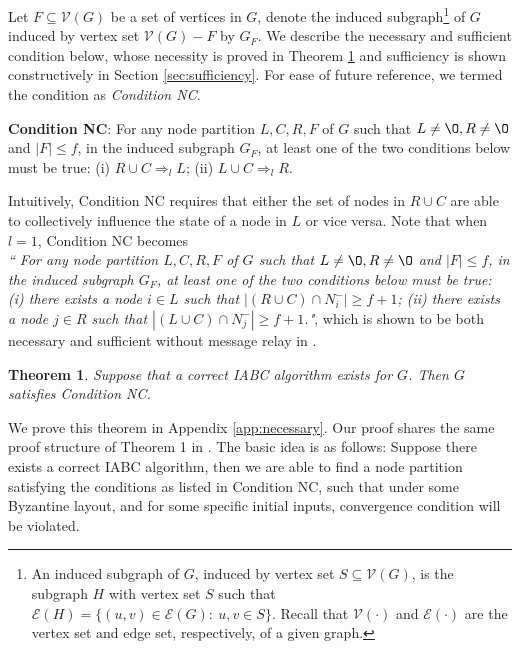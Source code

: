 \documentclass[letterpaper, 11pt]{article}
\newtheorem{theorem}{Theorem}[section]
\newcommand{\pth}[1]{\left( #1 \right)}
\newcommand{\calE}{{\mathcal{E}}}
\newcommand{\calV}{{\mathcal{V}}}
\begin{document}
Let $F\subseteq \calV(G)$ be a set of vertices in $G$, denote the induced subgraph\footnote{An induced subgraph of $G$, induced by vertex set $S\subseteq \calV(G)$, is the subgraph $H$ with vertex set $S$ such that $\calE(H)=\{(u,v)\in \calE(G): ~ u, v\in S\}$. Recall that $\calV(\cdot)$ and $\calE(\cdot)$ are the vertex set and edge set, respectively, of a given graph.} of $G$ induced by vertex set $\calV(G)-F$ by $G_F$. We describe the necessary and sufficient condition below, whose necessity is proved in Theorem \ref{thm:nc} and sufficiency is shown constructively in Section \ref{sec:sufficiency}. For ease of future reference, we termed the condition as \emph{Condition NC}.

\noindent\textbf{Condition NC}:
For any node partition $L, C, R, F$ of $G$ such that $L\not=\O, R\not=\O$ and $|F|\le f$, in the induced subgraph $G_F$,
at least one of the two conditions below must be true: (i) $R\cup C\Rightarrow_l L$; (ii) $L\cup C\Rightarrow_l R$. 

Intuitively, Condition NC requires that either the set of nodes in $R\cup C$ are able to collectively influence the state of a node in $L$ or vice versa. Note that when $l=1$, Condition NC becomes\\
\emph{``
For any node partition $L, C, R, F$ of $G$ such that $L\not=\O, R\not=\O$ and $|F|\le f$, in the induced subgraph $G_F$,
at least one of the two conditions below must be true: (i) there exists a node $i\in L$ such that $\left |\pth{R\cup C}\cap N_i^{-}\right |\ge f+1$; (ii) there exists a node $j\in R$ such that $\left |\pth{L\cup C}\cap N_j^{-}\right |\ge f+1$."}, which is shown to be both necessary and sufficient without message relay in \cite{Vaidya2012IABC}.



\begin{theorem}
\label{thm:nc}
Suppose that a correct IABC algorithm exists for $G$. Then $G$ satisfies Condition NC.
\end{theorem}
We prove this theorem in Appendix \ref{app:necessary}. Our proof shares the same proof structure of Theorem 1 in \cite{Vaidya2012IABC}.
The basic idea is as follows: Suppose there exists a correct IABC algorithm, then we are able to find a node partition satisfying the conditions as listed in Condition NC,
such that under some Byzantine layout, and for some specific initial inputs, convergence condition will be violated.
\end{document}
